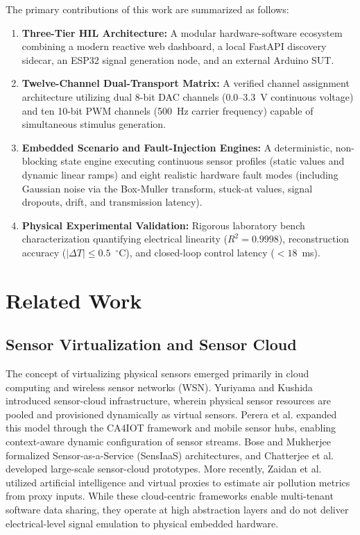 \documentclass[conference]{IEEEtran}
\begin{document}
The primary contributions of this work are summarized as follows:
\begin{enumerate}
    \item \textbf{Three-Tier HIL Architecture:} A modular hardware-software ecosystem combining a modern reactive web dashboard, a local FastAPI discovery sidecar, an ESP32 signal generation node, and an external Arduino SUT.
    \item \textbf{Twelve-Channel Dual-Transport Matrix:} A verified channel assignment architecture utilizing dual 8-bit DAC channels (0.0--3.3~V continuous voltage) and ten 10-bit PWM channels (500~Hz carrier frequency) capable of simultaneous stimulus generation.
    \item \textbf{Embedded Scenario and Fault-Injection Engines:} A deterministic, non-blocking state engine executing continuous sensor profiles (static values and dynamic linear ramps) and eight realistic hardware fault modes (including Gaussian noise via the Box-Muller transform, stuck-at values, signal dropouts, drift, and transmission latency).
    \item \textbf{Physical Experimental Validation:} Rigorous laboratory bench characterization quantifying electrical linearity ($R^2 = 0.9998$), reconstruction accuracy ($|\Delta T| \le 0.5$~$^\circ$C), and closed-loop control latency ($< 18$~ms).
\end{enumerate}

\section{Related Work}
\subsection{Sensor Virtualization and Sensor Cloud}
The concept of virtualizing physical sensors emerged primarily in cloud computing and wireless sensor networks (WSN). Yuriyama and Kushida \cite{yuriyama2010sensor} introduced sensor-cloud infrastructure, wherein physical sensor resources are pooled and provisioned dynamically as virtual sensors. Perera et al. \cite{perera2012ca4iot, perera2013dynamic} expanded this model through the CA4IOT framework and mobile sensor hubs, enabling context-aware dynamic configuration of sensor streams. Bose and Mukherjee \cite{bose2016sensiaas} formalized Sensor-as-a-Service (SensIaaS) architectures, and Chatterjee et al. \cite{chatterjee2021big} developed large-scale sensor-cloud prototypes. More recently, Zaidan et al. \cite{zaidan2023virtual} utilized artificial intelligence and virtual proxies to estimate air pollution metrics from proxy inputs. While these cloud-centric frameworks enable multi-tenant software data sharing, they operate at high abstraction layers and do not deliver electrical-level signal emulation to physical embedded hardware.
\end{document}
